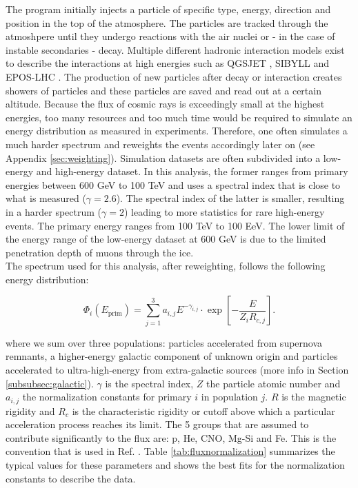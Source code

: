 \noindent The program initially injects a particle of specific type, energy, direction and position in the top of the atmosphere. The particles are tracked through the atmoshpere until they undergo reactions with the air nuclei or - in the case of instable secondaries - decay. Multiple different hadronic interaction models exist to describe the interactions at high energies such as QGSJET \cite{Ostapchenko:2010vb}, SIBYLL \cite{Riehn:2017mfm} and EPOS-LHC \cite{Pierog:2013ria}. The production of new particles after decay or interaction creates showers of particles and these particles are saved and read out at a certain altitude. Because the flux of cosmic rays is exceedingly small at the highest energies, too many resources and too much time would be required to simulate an energy distribution as measured in experiments. Therefore, one often simulates a much harder spectrum and reweights the events accordingly later on (see Appendix \ref{sec:weighting}). Simulation datasets are often subdivided into a low-energy and high-energy dataset. In this analysis, the former ranges from primary energies between 600 GeV to 100 TeV and uses a spectral index that is close to what is measured ($\gamma = 2.6$). The spectral index of the latter is smaller, resulting in a harder spectrum ($\gamma = 2$) leading to more statistics for rare high-energy events. The primary energy ranges from 100 TeV to 100 EeV. The lower limit of the energy range of the low-energy dataset at 600 GeV is due to the limited penetration depth of muons through the ice.\\

\noindent The spectrum used for this analysis, after reweighting, follows the following energy distribution:

\begin{equation}
\label{eq:gaisser}
\Phi_i \left(E_{\textrm{prim}}\right) = \sum^3_{j=1} a_{i,j} E^{-\gamma_{i,j}} \cdot \exp \left[- \frac{E}{Z_i R_{c,j}}\right].
\end{equation}

\noindent where we sum over three populations: particles accelerated from supernova remnants, a higher-energy galactic component of unknown origin and particles accelerated to ultra-high-energy from extra-galactic sources (more info in Section \ref{subsubsec:galactic}). $\gamma$ is the spectral index, $Z$ the particle atomic number and $a_{i,j}$ the normalization constants for primary $i$ in population $j$. $R$ is the magnetic rigidity and $R_c$ is the characteristic rigidity or cutoff above which a particular acceleration process reaches its limit. The 5 groups that are assumed to contribute significantly to the flux are: p, He, CNO, Mg-Si and Fe. This is the convention that is used in Ref. \cite{Gaisser:2013bla}. Table \ref{tab:fluxnormalization} summarizes the typical values for these parameters and shows the best fits for the normalization constants to describe the data.

